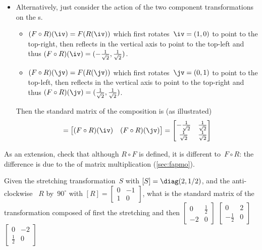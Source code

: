 \begin{example}
\begin{solution}
\begin{itemize}
\item Alternatively, just consider the action of the two component transformations on the s.
\begin{itemize}
\item \((F\circ R)(\iv)=F(R(\iv))\) which first rotates~\(\iv=(1,0)\) to point to the top-right, then reflects in the vertical axis to point to the top-left and thus \((F\circ R)(\iv)=(-\rt,\rt)\).
\item \((F\circ R)(\jv)=F(R(\jv))\) which first rotates~\(\jv=(0,1)\) to point to the top-left, then reflects in the vertical axis to point to the top-right and thus \((F\circ R)(\jv)=(\rt,\rt)\).
\end{itemize}

\begin{figbox}{}
Then the standard matrix of the composition is (as illustrated)
\begin{equation*}
[F\circ R]=\begin{bmatrix}(F\circ R)(\iv)&(F\circ R)(\jv)  \end{bmatrix}
=\begin{bmatrix} -\rt&\rt\\\rt&\rt \end{bmatrix}
\end{equation*}
\end{figbox}
\end{itemize}

\end{solution}
As an extension, check that although \(R\circ F\) is defined, it is 
different to~\(F\circ R\): the difference is due to the  of matrix multiplication (\cref{sec:fapmo}).
\end{example}



\begin{activity}
Given the stretching transformation~\(S\) with  \([S]=\diag(2,1/2)\), and the anti-clockwise ~\(R\) by~\(90^\circ\) with  \([R]=\begin{bmatrix} 0&-1\\1&0 \end{bmatrix}\), what is the standard matrix of the transformation composed of first the stretching and then 
{\(\begin{bmatrix} 0&\tfrac12\\-2&0 \end{bmatrix}\)}
{\(\begin{bmatrix} 0&2\\-\tfrac12&0 \end{bmatrix}\)}
{\(\begin{bmatrix} 0&-2\\\tfrac12&0 \end{bmatrix}\)}
\end{activity}




